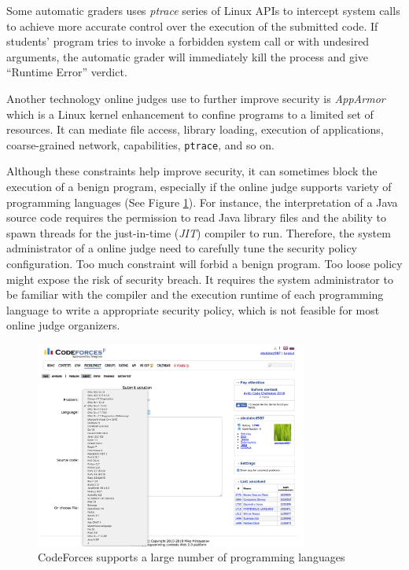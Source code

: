             Some automatic graders uses \emph{ptrace} series of Linux APIs to intercept system calls to
            achieve more accurate control over the execution of the submitted code.
            If students' program tries to invoke a forbidden system call or with undesired arguments,
            the automatic grader will immediately kill the process and give ``Runtime Error'' verdict.

            Another technology online judges use to further improve security is \emph{AppArmor} \cite{apparmor}
            which is a Linux kernel enhancement to confine programs to a limited set of resources.
            It can mediate file access, library loading, execution of applications, coarse-grained network,
            capabilities, \texttt{ptrace}, and so on.

            Although these constraints help improve security,
            it can sometimes block the execution of a benign program,
            especially if the online judge supports variety of programming languages (See Figure \ref{fig:codeforces-languages}).
            For instance, the interpretation of a Java source code requires the permission to read
            Java library files and the ability to spawn threads for the just-in-time (\emph{JIT}) compiler to run.
            Therefore, the system administrator of a online judge need to carefully tune the security policy configuration.
            Too much constraint will forbid a benign program.
            Too loose policy might expose the risk of security breach.
            It requires the system administrator to be familiar with the compiler and the execution runtime
            of each programming language to write a appropriate security policy,
            which is not feasible for most online judge organizers.
            \begin{figure}[htp]
                \centering
                \includegraphics[width=0.8\textwidth]{img/codeforces-languages.png}
                \caption{CodeForces supports a large number of programming languages}
                \label{fig:codeforces-languages}
            \end{figure}

